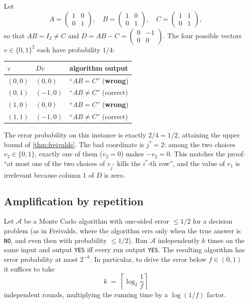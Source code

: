 \begin{example}
\label{ex:freivalds_walkthrough}
Let
\[
  A = \begin{pmatrix} 1 & 0 \\ 0 & 1 \end{pmatrix},\quad
  B = \begin{pmatrix} 1 & 0 \\ 0 & 1 \end{pmatrix},\quad
  C = \begin{pmatrix} 1 & 1 \\ 0 & 1 \end{pmatrix},
\]
so that $AB = I_2 \ne C$ and $D = AB - C = \begin{pmatrix} 0 & -1 \\ 0 & 0 \end{pmatrix}$. The four possible vectors $v \in \{0,1\}^2$ each have probability $1/4$:
\begin{center}
\begin{tabular}{lll}
\toprule
$v$ & $Dv$ & algorithm output \\
\midrule
$(0, 0)$ & $(0, 0)$ & ``$AB = C$'' (\textbf{wrong}) \\
$(0, 1)$ & $(-1, 0)$ & ``$AB \ne C$'' (correct) \\
$(1, 0)$ & $(0, 0)$ & ``$AB = C$'' (\textbf{wrong}) \\
$(1, 1)$ & $(-1, 0)$ & ``$AB \ne C$'' (correct) \\
\bottomrule
\end{tabular}
\end{center}
The error probability on this instance is exactly $2/4 = 1/2$, attaining the upper bound of \cref{thm:freivalds}. The bad coordinate is $j^* = 2$: among the two choices $v_2 \in \{0, 1\}$, exactly one of them ($v_2 = 0$) makes $-v_2 = 0$. This matches the proof: ``at most one of the two choices of $v_{j^*}$ kills the $i^*$-th row'', and the value of $v_1$ is irrelevant because column $1$ of $D$ is zero.
\end{example}

\subsection{Amplification by repetition}

\begin{theorem}
\label{thm:amplification}
Let $\mathcal{A}$ be a Monte Carlo algorithm with one-sided error $\le 1/2$ for a decision problem (as in Freivalds, where the algorithm errs only when the true answer is \texttt{NO}, and even then with probability $\le 1/2$). Run $\mathcal{A}$ independently $k$ times on the same input and output \texttt{YES} iff every run output \texttt{YES}. The resulting algorithm has error probability at most $2^{-k}$. In particular, to drive the error below $f \in (0, 1)$ it suffices to take
\[
  k \;=\; \left\lceil \log_2 \frac{1}{f} \right\rceil
\]
independent rounds, multiplying the running time by a $\log(1/f)$ factor.
\end{theorem}

